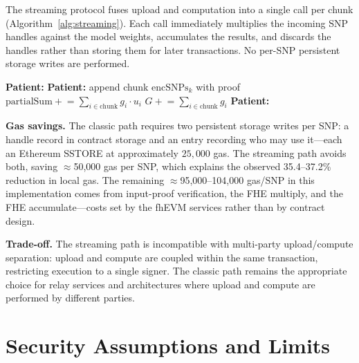 \documentclass[10pt]{article}
\begin{document}
The streaming protocol fuses upload and computation into a single call per chunk
(Algorithm~\ref{alg:streaming}).  Each call immediately multiplies the incoming SNP
handles against the model weights, accumulates the results, and discards the handles
rather than storing them for later transactions.  No per-SNP persistent storage writes
are performed.

\begin{algorithm}[t]
\caption{Streaming PRS computation (patient, single-signer flow)}
\label{alg:streaming}
\small
\begin{algorithmic}[1]
\State \textbf{Patient:} 
  \State \textbf{Patient:} append chunk $\mathrm{encSNPs}_{k}$ with proof
  \State \quad $\mathrm{partialSum} \mathrel{+}= \sum_{i \in \mathrm{chunk}} g_i \cdot u_i$
  \State \quad $G \mathrel{+}= \sum_{i \in \mathrm{chunk}} g_i$
\EndFor
\State \textbf{Patient:} 
\end{algorithmic}
\end{algorithm}

\textbf{Gas savings.}
The classic path requires two persistent storage writes per SNP: a handle record in
contract storage and an entry recording who may use it---each an Ethereum SSTORE at
approximately $25{,}000$ gas.  The streaming path avoids both, saving
$\approx$50,000 gas per SNP, which explains the observed 35.4--37.2\% reduction in
local gas.  The remaining $\approx$95,000--104,000 gas/SNP in this implementation comes
from input-proof verification, the FHE multiply, and the FHE accumulate---costs set by
the fhEVM services rather than by contract design.

\textbf{Trade-off.}
The streaming path is incompatible with multi-party upload/compute separation:
upload and compute are coupled within the same transaction, restricting execution
to a single signer.  The classic path remains the appropriate choice for relay
services and architectures where upload and compute are performed by different
parties.

\section{Security Assumptions and Limits}
\label{sec:security}
\end{document}
